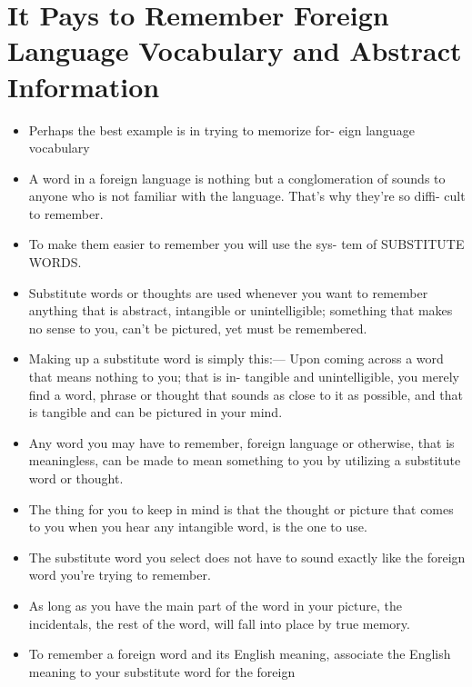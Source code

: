     \section*{It Pays to Remember Foreign Language
    Vocabulary and Abstract Information}
        \begin{itemize}
            \item Perhaps the best example is in trying to memorize for-
            eign language vocabulary
            \item A word in a foreign language is
            nothing but a conglomeration of sounds to anyone who is not familiar with the language. That's why they're so diffi-
            cult to remember.
            \item To make them easier to remember you will use the sys-
            tem of SUBSTITUTE WORDS.
            \item Substitute words or
            thoughts are used whenever you want to remember anything that is abstract, intangible or unintelligible; something that makes no sense to you, can't be pictured, yet
            must be remembered.
            \item Making up a substitute word is simply this:— Upon
            coming across a word that means nothing to you; that is in-
            tangible and unintelligible, you merely find a word, phrase
            or thought that sounds as close to it as possible, and that is
            tangible and can be pictured in your mind.
            \item Any word you may have to remember, foreign language
            or otherwise, that is meaningless, can be made to mean
            something to you by utilizing a substitute word or thought.
            \item The thing for you to keep in
            mind is that the thought or picture that comes to you when
            you hear any intangible word, is the one to use.
            \item The substitute word you select
            does not have to sound exactly like the foreign word you're
            trying to remember.
            \item As long as you have the main part of the word in your picture, the
            incidentals, the rest of the word, will fall into place by true
            memory.
            \item To remember a foreign word and its English meaning, associate the
            English meaning to your substitute word for the foreign

\end{itemize}
